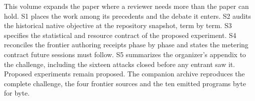 \documentclass[11pt]{article}
\begin{document}
\izmaketitle
\noindent This volume expands the paper where a reviewer needs more than the paper can hold. S1 places
the work among its precedents and the debate it enters. S2 audits the historical native objective at
the repository snapshot, term by term. S3 specifies the statistical and resource contract of the
proposed experiment. S4 reconciles the frontier authoring receipts phase by phase and states the
metering contract future sessions must follow. S5 summarizes the organizer's appendix to the
challenge, including the sixteen attacks closed before any entrant saw it. Proposed experiments
remain proposed. The companion archive reproduces the complete challenge, the four frontier sources
and the ten emitted programs byte for byte.

{\small\tableofcontents}
\clearpage







{\small}
\end{document}
